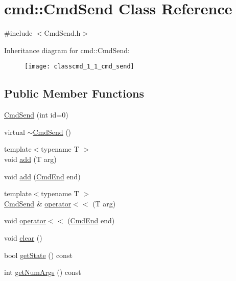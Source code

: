 \hypertarget{classcmd_1_1_cmd_send}{\section{cmd\+:\+:Cmd\+Send Class Reference}
\label{classcmd_1_1_cmd_send}
}


{\ttfamily \#include $<$Cmd\+Send.\+h$>$}

Inheritance diagram for cmd\+:\+:Cmd\+Send\+:\begin{figure}[H]
\begin{center}
\leavevmode
\texttt{[image: classcmd\_1\_1\_cmd\_send]}
\end{center}
\end{figure}
\subsection*{Public Member Functions}
\begin{DoxyCompactItemize}
\item 
\hyperlink{classcmd_1_1_cmd_send_a0bde526ff8e0d36be47f2ad4f614be99}{Cmd\+Send} (int id=0)
\item 
virtual \hyperlink{classcmd_1_1_cmd_send_abf939f6219c5c5d5e5caf59d36b7d3ed}{$\sim$\+Cmd\+Send} ()
\item 
{\footnotesize template$<$typename T $>$ }\\void \hyperlink{classcmd_1_1_cmd_send_adf3459b9e64391790a844ade051a07eb}{add} (T arg)
\item 
void \hyperlink{classcmd_1_1_cmd_send_a189a3db925e6be886c787c1206846b1a}{add} (\hyperlink{class_cmd_end}{Cmd\+End} end)
\item 
{\footnotesize template$<$typename T $>$ }\\\hyperlink{classcmd_1_1_cmd_send}{Cmd\+Send} \& \hyperlink{classcmd_1_1_cmd_send_a4c90185bdf7ed1b3442bd69a2a9cd5b2}{operator$<$$<$} (T arg)
\item 
void \hyperlink{classcmd_1_1_cmd_send_ae11b3feb18c2b48113ad048c7f2bda2e}{operator$<$$<$} (\hyperlink{class_cmd_end}{Cmd\+End} end)
\item 
void \hyperlink{classcmd_1_1_cmd_send_abefba8ff2e9c9c2e13c3ccda96a34e32}{clear} ()
\item 
bool \hyperlink{classcmd_1_1_cmd_send_a2906af83411722ad6ca6d074e3155396}{get\+State} () const 
\item 
int \hyperlink{classcmd_1_1_cmd_send_a0434b09f3aa8ad368b043163edff3e44}{get\+Num\+Args} () const 
\end{DoxyCompactItemize}
